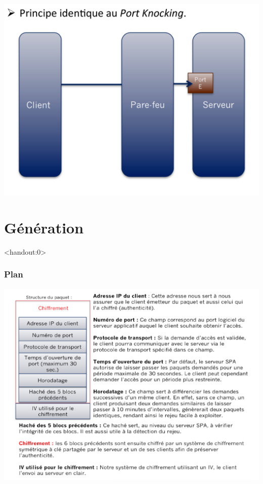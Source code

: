 \begin{frame}[fragile]
\centerline{\includegraphics[scale=0.35]{slide5}}
\end{frame}


\section{Génération}

\begin{frame}<handout:0>
  \frametitle{Plan}
  \tableofcontents[currentsection,subsectionstyle=hide]
\end{frame}

\begin{frame}[fragile]
\centerline{\includegraphics[scale=0.35]{slide6}}
\end{frame}



